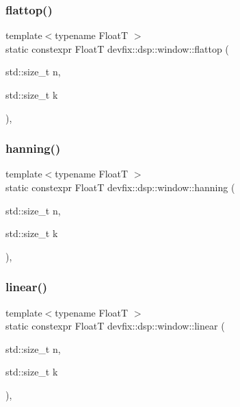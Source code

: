 \subsubsection{\texorpdfstring{flattop()}{flattop()}}
{\footnotesize\ttfamily template$<$typename FloatT $>$ \\
static constexpr FloatT devfix\+::dsp\+::window\+::flattop (\begin{DoxyParamCaption}\item[{std\+::size\+\_\+t}]{n,  }\item[{std\+::size\+\_\+t}]{k }\end{DoxyParamCaption})\hspace{0.3cm}{\ttfamily [inline]}, {\ttfamily [static]}}

\mbox{\label{structdevfix_1_1dsp_1_1window_a94b16d1da4a560e625ae93284ed6f1a4}} 
\subsubsection{\texorpdfstring{hanning()}{hanning()}}
{\footnotesize\ttfamily template$<$typename FloatT $>$ \\
static constexpr FloatT devfix\+::dsp\+::window\+::hanning (\begin{DoxyParamCaption}\item[{std\+::size\+\_\+t}]{n,  }\item[{std\+::size\+\_\+t}]{k }\end{DoxyParamCaption})\hspace{0.3cm}{\ttfamily [inline]}, {\ttfamily [static]}}

\mbox{\label{structdevfix_1_1dsp_1_1window_a334a42b01504381fb13459f566aa2025}} 
\subsubsection{\texorpdfstring{linear()}{linear()}}
{\footnotesize\ttfamily template$<$typename FloatT $>$ \\
static constexpr FloatT devfix\+::dsp\+::window\+::linear (\begin{DoxyParamCaption}\item[{std\+::size\+\_\+t}]{n,  }\item[{std\+::size\+\_\+t}]{k }\end{DoxyParamCaption})\hspace{0.3cm}{\ttfamily [inline]}, {\ttfamily [static]}}

